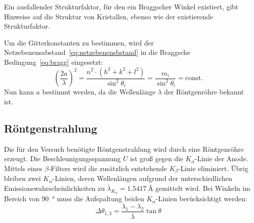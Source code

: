 Ein ausfallender Strukturfaktor, für den ein Braggscher Winkel existiert,
gibt Hinweise auf die Struktur von Kristallen,
ebenso wie der existierende Strukturfaktor.

Um die Gitterkonstanten zu bestimmen,
wird der Netzebenensabstand~\eqref{eq:netzebenensbstand}
in die Braggsche Bedingung~\eqref{eq:bragg} eingesetzt:
\begin{equation}
  \label{eq:const}
  {\left(\frac{2a}{\lambda}\right)}^2
  = \frac{n^2 \cdot \left(h^2 + k^2 + l^2\right)}{\sin^2\!\theta_i}
  = \frac{m_i}{\sin^2\!\theta_i} = \text{const.}
\end{equation}
Nun kann $a$ bestimmt werden, da die Wellenlänge $\lambda$ der Röntgenröhre bekannt ist.


\subsection{Röntgenstrahlung}%
\label{sub:roentgenstrahlung}
Die für den Versuch benötigte Röntgenstrahlung wird durch eine Röntgenröhre erzeugt.
Die Beschleunigungsspannung $U$ ist groß gegen die $K_\alpha$-Linie der Anode.
Mittels eines $\beta$-Filters wird die zusätzlich entstehende $K_\beta$-Linie eliminiert.
Übrig bleiben zwei $K_\alpha$-Linien, deren Wellenlängen aufgrund der unterschiedlichen
Emissionswahrscheinlichkeiten zu $\overline{\lambda}_{K_\alpha} = \SI{1.5417}{\angstrom}$
gemittelt wird.
Bei Winkeln im Bereich von \SI{90}{\degree} muss die Aufspaltung beiden $K_\alpha$-Linien
berücksichtigt werden:
\begin{equation}
  \Delta \theta_{1, 2} = \frac{\lambda_1 - \lambda_2}{\overline{\lambda}} \tan{\theta}
  \label{eq:lamtheta}
\end{equation}

